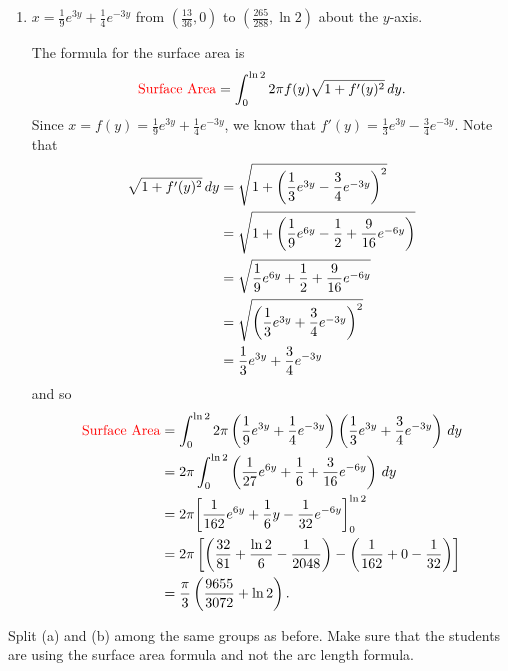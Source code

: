 \documentclass[handout,instructornotes]{ximera}
\begin{document}
\begin{problem}
\begin{enumerate}
		\item  $x = \frac{1}{9} e^{3y} + \frac{1}{4} e^{-3y}$ from $\left( \frac{13}{36}, 0 \right)$ to $\left( \frac{265}{288}, \ln 2 \right)$ about the $y$-axis.
		\begin{freeResponse}
		The formula for the surface area is
			\[
			\text{{\color{red} Surface Area}} = \int_0^{\ln 2} 2 \pi f(y) \sqrt{1+f'(y)^2} \,d y.
			\]
		Since $x = f(y) = \frac{1}{9} e^{3y} + \frac{1}{4} e^{-3y}$, 
		we know that $f'(y) = \frac{1}{3} e^{3y} - \frac{3}{4} e^{-3y}$.  
		Note that
			\begin{align*}
			\sqrt{1+f'(y)^2} \,d y  &= \sqrt{1+ \left( \frac{1}{3}e^{3y} - \frac{3}{4}e^{-3y} \right)^2}  \\
			&=  \sqrt{1+ \left( \frac{1}{9}e^{6y} - \frac{1}{2} + \frac{9}{16}e^{-6y} \right)}  \\
			&= \sqrt{ \frac{1}{9}e^{6y} + \frac{1}{2} + \frac{9}{16}e^{-6y} }   \\
			&= \sqrt{ \left( \frac{1}{3}e^{3y} + \frac{3}{4}e^{-3y} \right)^2}  \\
			&= \frac{1}{3}e^{3y} + \frac{3}{4}e^{-3y}
			\end{align*}
		and so
			\begin{align*}
			\text{{\color{red} Surface Area}} &= \int_0^{\ln 2} 2 \pi \left( \frac{1}{9} e^{3y} + \frac{1}{4} e^{-3y} \right) \left( \frac{1}{3}e^{3y} + \frac{3}{4}e^{-3y} \right) \,d y  \\
			&= 2 \pi \int_0^{\ln 2} \left( \frac{1}{27}e^{6y} + \frac{1}{6} + \frac{3}{16}e^{-6y} \right) \,d y  \\
			&= 2 \pi \bigg[ \frac{1}{162}e^{6y} + \frac{1}{6}y - \frac{1}{32}e^{-6y} \bigg]_0^{\ln 2}  \\
			&= 2 \pi \left[ \left( \frac{32}{81} + \frac{\ln 2}{6} - \frac{1}{2048} \right) - \left( \frac{1}{162} + 0 - \frac{1}{32} \right) \right]  \\
			&= \frac{\pi}{3} \left( \frac{9655}{3072} + \ln 2 \right).
			\end{align*}
		\end{freeResponse}
		
	\end{enumerate}
	
\end{problem}

\begin{instructorNotes}
Split (a) and (b) among the same groups as before.  
Make sure that the students are using the surface area formula and not the arc length formula.
\end{instructorNotes}
















	
	
	
	
	
	
	
	
	

	










								
				
				
	
\end{document}

